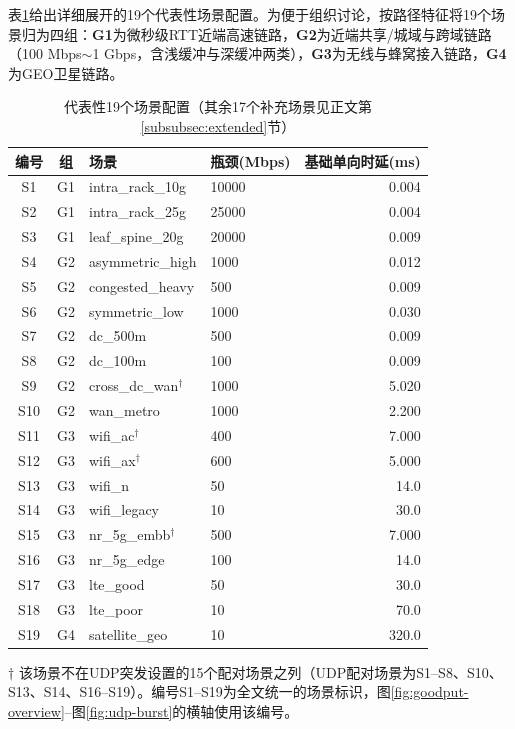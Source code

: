 \documentclass[10pt,twocolumn]{article}
\begin{document}
表\ref{tab:scenarios}给出详细展开的19个代表性场景配置。为便于组织讨论，按路径特征将19个场景归为四组：\textbf{G1}为微秒级RTT近端高速链路，\textbf{G2}为近端共享/城域与跨域链路（100 Mbps$\sim$1 Gbps，含浅缓冲与深缓冲两类），\textbf{G3}为无线与蜂窝接入链路，\textbf{G4}为GEO卫星链路。

\begin{table}[htbp]
\centering
\caption{代表性19个场景配置（其余17个补充场景见正文第\ref{subsubsec:extended}节）}
\label{tab:scenarios}
\footnotesize
\setlength{\tabcolsep}{3.5pt}
\begin{tabular}{@{}ccllr@{}}
\toprule
\textbf{编号} & \textbf{组} & \textbf{场景} & \textbf{瓶颈(Mbps)} & \textbf{基础单向时延(ms)} \\
\midrule
S1 & G1 & intra\_rack\_10g & 10000 & 0.004 \\
S2 & G1 & intra\_rack\_25g & 25000 & 0.004 \\
S3 & G1 & leaf\_spine\_20g & 20000 & 0.009 \\
\midrule
S4 & G2 & asymmetric\_high & 1000 & 0.012 \\
S5 & G2 & congested\_heavy & 500 & 0.009 \\
S6 & G2 & symmetric\_low & 1000 & 0.030 \\
S7 & G2 & dc\_500m & 500 & 0.009 \\
S8 & G2 & dc\_100m & 100 & 0.009 \\
S9 & G2 & cross\_dc\_wan$^{\dagger}$ & 1000 & 5.020 \\
S10 & G2 & wan\_metro & 1000 & 2.200 \\
\midrule
S11 & G3 & wifi\_ac$^{\dagger}$ & 400 & 7.000 \\
S12 & G3 & wifi\_ax$^{\dagger}$ & 600 & 5.000 \\
S13 & G3 & wifi\_n & 50 & 14.0 \\
S14 & G3 & wifi\_legacy & 10 & 30.0 \\
S15 & G3 & nr\_5g\_embb$^{\dagger}$ & 500 & 7.000 \\
S16 & G3 & nr\_5g\_edge & 100 & 14.0 \\
S17 & G3 & lte\_good & 50 & 30.0 \\
S18 & G3 & lte\_poor & 10 & 70.0 \\
\midrule
S19 & G4 & satellite\_geo & 10 & 320.0 \\
\bottomrule
\end{tabular}
\vspace{2pt}

\raggedright
\scriptsize $\dagger$ 该场景不在UDP突发设置的15个配对场景之列（UDP配对场景为S1--S8、S10、S13、S14、S16--S19）。编号S1--S19为全文统一的场景标识，图\ref{fig:goodput-overview}--图\ref{fig:udp-burst}的横轴使用该编号。
\end{table}
\end{document}
